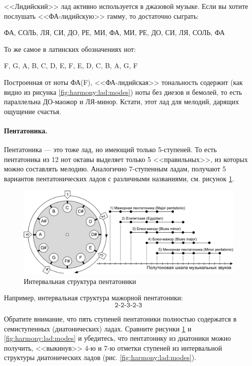 <<Лидийский>> лад активно используется в джазовой музыке. Если вы хотите послушать <<ФА-лидийскую>> гамму, то достаточно сыграть:
\begin{center}
    ФА, СОЛЬ, ЛЯ, СИ, ДО, РЕ, МИ, ФА, МИ, РЕ, ДО, СИ, ЛЯ, СОЛЬ, ФА
\end{center}

То же самое в латинских обозначениях нот:
\begin{center}
    F, G, A, B, C, D, E, F, E, D, C, B, A, G, F
\end{center}
 
Построенная от ноты ФА(F), <<ФА-лидийская>> тональность содержит (как видно из рисунка \ref{fig:harmony:lad:modes}) ноты без диезов и бемолей, то есть параллельна ДО-маожор и ЛЯ-минор. Кстати, этот лад для мелодий, дарящих ощущение счастья.


\paragraph{Пентатоника.} Пентатоника --- это тоже лад, но имеющий только 5-ступеней. То есть пентатоника из 12 нот октавы выделяет только 5 <<правильных>>, из которых можно составлять мелодию. Аналогично 7-ступенным ладам, получают 5 вариантов пентатонических ладов с различными названиями, см. рисунок \ref{fig:harmony:lad:pentatonic}.

\begin{figure}[!ht]
    \centering
    \includegraphics[width=\textwidth]{fig/intervals/pentatonic} 
    \caption{Интервальная структура пентатоники}\label{fig:harmony:lad:pentatonic}
\end{figure} 

Например, интервальная структура мажорной пентатоники:
\[
    \texttt{2-2-3-2-3}
\]

Обратите внимание, что пять ступеней пентатоники полностью содержатся в семиступенных (диатонических) ладах. Сравните рисунки \ref{fig:harmony:lad:pentatonic} и \ref{fig:harmony:lad:modes} и убедитесь, что пентатонику из диатоники можно получить, <<выкинув>> 4-ю и 7-ю отметки ступеней из интервальной структуры диатонических ладов (рис. \ref{fig:harmony:lad:modes}).

